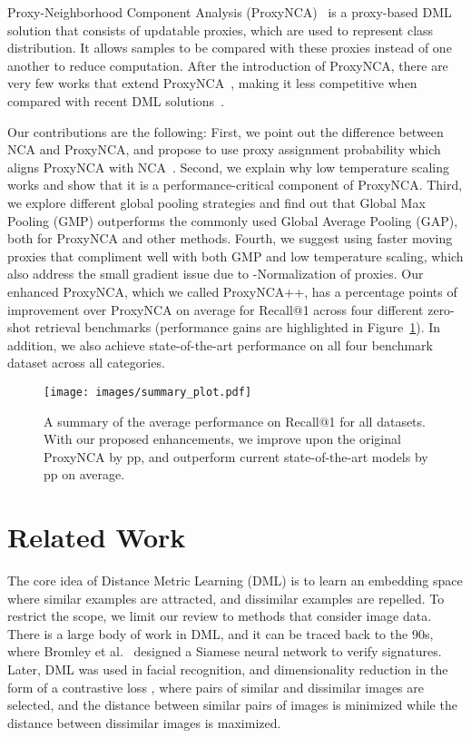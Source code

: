 \documentclass[runningheads]{llncs}
\begin{document}
Proxy-Neighborhood Component Analysis (ProxyNCA)~\cite{movshovitz2017no} is a proxy-based DML solution that consists of updatable proxies, which are used to represent class distribution. It allows samples to be compared with these proxies instead of one another to reduce computation. 
After the introduction of ProxyNCA, there are very few works that extend ProxyNCA~\cite{xuan2018deep,sanakoyeu2019divide}, making it less competitive when compared with recent DML solutions~\cite{wang2019multi,jacob2019metric,zhai2019}.

Our contributions are the following: First, we point out the difference between NCA and ProxyNCA, and propose to use proxy assignment probability which aligns ProxyNCA with NCA~\cite{goldberger2005neighbourhood}. Second, we explain why low temperature scaling works and show that it is a performance-critical component of ProxyNCA. Third, we explore different global pooling strategies and find out that Global Max Pooling (GMP) outperforms the commonly used Global Average Pooling (GAP), both for ProxyNCA and other methods. Fourth, we suggest using faster moving proxies that compliment well with both GMP and low temperature scaling, which also address the small gradient issue due to -Normalization of proxies. 
Our enhanced ProxyNCA, which we called ProxyNCA++, has a  percentage points of improvement over ProxyNCA on average for Recall@1 across four different zero-shot retrieval benchmarks (performance gains are highlighted in Figure~\ref{fig:summ}). In addition, we also achieve state-of-the-art performance on all four benchmark dataset across all categories.

\begin{figure}[H]
  \centering
    \caption{A summary of the average performance on Recall@1 for all datasets. With our proposed enhancements, we improve upon the original ProxyNCA by pp, and outperform current state-of-the-art models by pp on average.}
    \bigskip
  \texttt{[image: images/summary\_plot.pdf]}
  \label{fig:summ}
\end{figure}


\section{Related Work}\label{sec:related}
The core idea of Distance Metric Learning (DML) is to learn an embedding space where similar examples are attracted, and dissimilar examples are repelled. 
To restrict the scope, we limit our review to methods that consider image data. There is a large body of work in DML, and it can be traced back to the 90s, where Bromley et al.~\cite{Bromley:1993:SVU:2987189.2987282} designed a Siamese neural network to verify signatures. Later, DML was used in facial recognition, and dimensionality reduction in the form of a contrastive loss \cite{chopra2005learning,hadsell2006dimensionality},
where pairs of similar and dissimilar images are selected, and the distance between similar pairs of images is minimized while the distance between dissimilar images is maximized.
\end{document}
